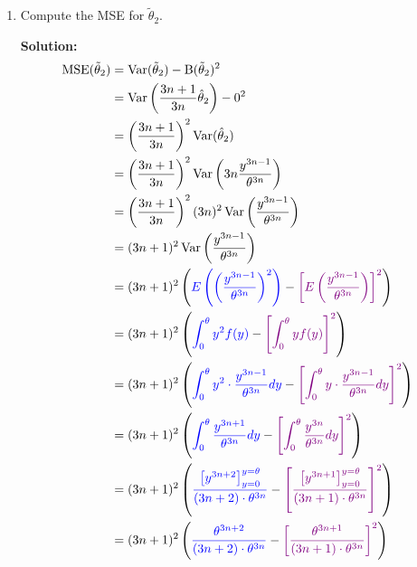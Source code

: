 \documentclass[12pt]{article}
\newcommand{\pars}[1]{\left( {#1} \right) }
\newcommand{\brac}[1]{\left[ {#1} \right] }
\newcommand{\E}[1]{E\left( {#1} \right)}
\newcommand*{\Var}[1]{\operatorname{Var}(#1)}
\begin{document}
\begin{enumerate}
\begin{enumerate}
        \newpage
        \item 
        Compute the MSE for $\tilde{\theta}_2$.
        \begin{mybox}
                \textbf{Solution:}
                \begin{align}
                    \operatorname{MSE}(\tilde{\theta}_2) &= \Var{\tilde{\theta}_2} - \operatorname{B}(\tilde{\theta}_2)^2 \notag \\
                    &=  \operatorname{Var}\pars{\frac{3n+1}{3n}\hat{\theta}_2} - 0^2 \notag \\
                    &=  \pars{\frac{3n+1}{3n}}^2\operatorname{Var}(\hat{\theta}_2) \notag \\
                    &=  \pars{\frac{3n+1}{3n}}^2 \operatorname{Var}\pars{3n \frac{y^{3n-1}}{\theta^{3n}}} \notag \\
                    &=  \pars{\frac{3n+1}{3n}}^2 (3n)^2\operatorname{Var}\pars{ \frac{y^{3n-1}}{\theta^{3n}}} \notag \\
                    &=  (3n+1)^2 \operatorname{Var}\pars{ \frac{y^{3n-1}}{\theta^{3n}}} \notag \\
                    &= (3n+1)^2  \pars{ \color{blue}\E{\pars{\frac{y^{3n-1}}{\theta^{3n}}}^2}\color{black} - \color{violet}\brac{\E{ \frac{y^{3n-1}}{\theta^{3n}}}}^2 \color{black} }\notag\\
                    &= (3n+1)^2  \pars{ \color{blue}\int_{0}^{\theta} y^2 f(y) \color{black}-\color{violet} \brac{\int_{0}^{\theta} y f(y)}^2 \color{black}}\notag\\
                    &=  (3n+1)^2   \pars{\color{blue}\int_{0}^{\theta} y^2 \cdot \frac{y^{3n-1}}{\theta^{3n}} dy \color{black}-\color{violet} \brac{\int_{0}^{\theta} y \cdot \frac{y^{3n-1}}{\theta^{3n}} dy}^2 \color{black}}\notag\\
                    &= (3n+1)^2   \pars{\color{blue}\int_{0}^{\theta}  \frac{y^{3n+1}}{\theta^{3n}} dy \color{black}-\color{violet} \brac{\int_{0}^{\theta} \frac{y^{3n}}{\theta^{3n}} dy}^2 \color{black}}\notag\\
                    &= (3n+1)^2  \pars{\color{blue} \frac{\brac{y^{3n+2}}_{y=0}^{y=\theta}}{(3n+2) \cdot \theta^{3n}} \color{black}-\color{violet} \brac{ \frac{\brac{y^{3n+1}}_{y=0}^{y=\theta}}{(3n+1) \cdot \theta^{3n}}}^2 \color{black}}\notag\\
                    &= (3n+1)^2  \pars{\color{blue} \frac{\theta^{3n+2}}{(3n+2) \cdot \theta^{3n}} \color{black}-\color{violet} \brac{ \frac{\theta^{3n+1}}{(3n+1) \cdot \theta^{3n}}}^2 \color{black}}\notag\\

\end{align}
\end{mybox}
\end{enumerate}
\end{enumerate}
\end{document}
